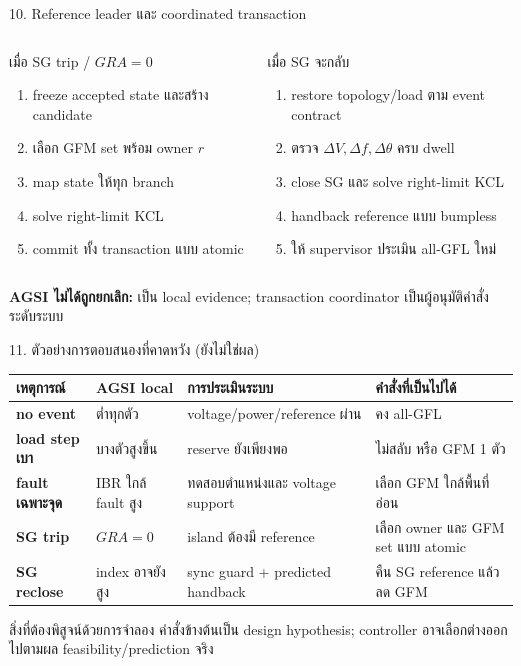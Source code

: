 \documentclass[aspectratio=169,12pt]{beamer}
\begin{document}
\begin{frame}{10. Reference leader และ coordinated transaction}
\begin{columns}[T,onlytextwidth]
\begin{block}{เมื่อ SG trip / $GRA=0$}
\begin{enumerate}
  \item freeze accepted state และสร้าง candidate
  \item เลือก GFM set พร้อม owner $r$
  \item map state ให้ทุก branch
  \item solve right-limit KCL
  \item commit ทั้ง transaction แบบ atomic
\end{enumerate}
\end{block}
\begin{block}{เมื่อ SG จะกลับ}
\begin{enumerate}
  \item restore topology/load ตาม event contract
  \item ตรวจ $\Delta V,\Delta f,\Delta\theta$ ครบ dwell
  \item close SG และ solve right-limit KCL
  \item handback reference แบบ bumpless
  \item ให้ supervisor ประเมิน all-GFL ใหม่
\end{enumerate}
\end{block}
\end{columns}
\vspace{.2cm}
\centering
\textbf{AGSI ไม่ได้ถูกยกเลิก:} เป็น local evidence; transaction coordinator เป็นผู้อนุมัติคำสั่งระดับระบบ
\end{frame}

\begin{frame}[shrink=6]{11. ตัวอย่างการตอบสนองที่คาดหวัง (ยังไม่ใช่ผล)}
\begin{tabularx}{\textwidth}{>{\bfseries}p{}XXX}
\toprule
เหตุการณ์ & AGSI local & การประเมินระบบ & คำสั่งที่เป็นไปได้ \\
\midrule
no event & ต่ำทุกตัว & voltage/power/reference ผ่าน & คง all-GFL \\
load step เบา & บางตัวสูงขึ้น & reserve ยังเพียงพอ & ไม่สลับ หรือ GFM 1 ตัว \\
fault เฉพาะจุด & IBR ใกล้ fault สูง & ทดสอบตำแหน่งและ voltage support & เลือก GFM ใกล้พื้นที่อ่อน \\
SG trip & $GRA=0$ & island ต้องมี reference & เลือก owner และ GFM set แบบ atomic \\
SG reclose & index อาจยังสูง & sync guard + predicted handback & คืน SG reference แล้วลด GFM \\
\bottomrule
\end{tabularx}
\vspace{.35cm}
\begin{alertblock}{สิ่งที่ต้องพิสูจน์ด้วยการจำลอง}
คำสั่งข้างต้นเป็น design hypothesis; controller อาจเลือกต่างออกไปตามผล feasibility/prediction จริง
\end{alertblock}
\end{frame}
\end{document}
